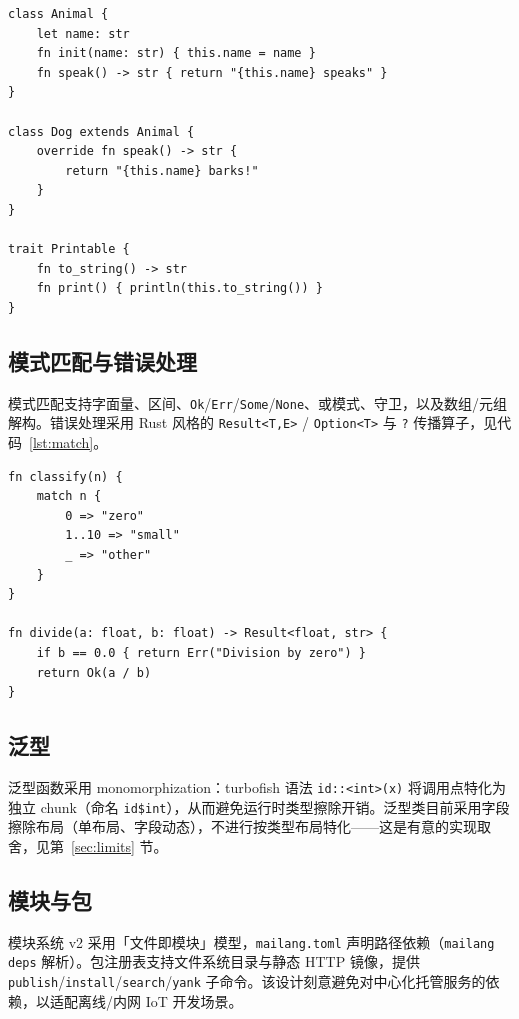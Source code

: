 \documentclass[10pt,a4paper]{article}
\begin{document}
\begin{lstlisting}[language={},caption={类继承与 Trait},label={lst:oop},float]
class Animal {
    let name: str
    fn init(name: str) { this.name = name }
    fn speak() -> str { return "{this.name} speaks" }
}

class Dog extends Animal {
    override fn speak() -> str {
        return "{this.name} barks!"
    }
}

trait Printable {
    fn to_string() -> str
    fn print() { println(this.to_string()) }
}
\end{lstlisting}

\subsection{模式匹配与错误处理}

模式匹配支持字面量、区间、\texttt{Ok}/\texttt{Err}/\texttt{Some}/\texttt{None}、或模式、守卫，以及数组/元组解构。错误处理采用 Rust 风格的 \texttt{Result<T,E>} / \texttt{Option<T>} 与 \texttt{?} 传播算子，见代码~\ref{lst:match}。

\begin{lstlisting}[language={},caption={模式匹配与 Result/Option},label={lst:match},float]
fn classify(n) {
    match n {
        0 => "zero"
        1..10 => "small"
        _ => "other"
    }
}

fn divide(a: float, b: float) -> Result<float, str> {
    if b == 0.0 { return Err("Division by zero") }
    return Ok(a / b)
}
\end{lstlisting}

\subsection{泛型}

泛型函数采用 monomorphization：turbofish 语法 \texttt{id::<int>(x)} 将调用点特化为独立 chunk（命名 \texttt{id\$int}），从而避免运行时类型擦除开销。泛型类目前采用字段擦除布局（单布局、字段动态），不进行按类型布局特化——这是有意的实现取舍，见第~\ref{sec:limits} 节。

\subsection{模块与包}

模块系统 v2 采用「文件即模块」模型，\texttt{mailang.toml} 声明路径依赖（\texttt{mailang deps} 解析）。包注册表支持文件系统目录与静态 HTTP 镜像，提供 \texttt{publish}/\texttt{install}/\texttt{search}/\texttt{yank} 子命令。该设计刻意避免对中心化托管服务的依赖，以适配离线/内网 IoT 开发场景。
\end{document}
